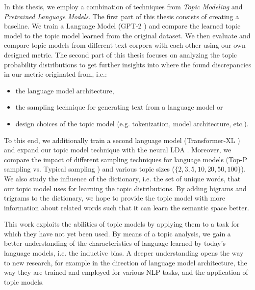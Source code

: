 In this thesis, we employ a combination of techniques from \textit{Topic Modeling} and \textit{Pretrained Language Models}. The first part of this thesis consists of creating a baseline. We train a Language Model (GPT-2 \cite{gpt-2}) and compare the learned topic model to the topic model learned from the original dataset. We then evaluate and compare topic models from different text corpora with each other using our own designed metric. The second part of this thesis focuses on analyzing the topic probability distributions to get further insights into where the found discrepancies in our metric originated from, i.e.:
\begin{itemize}
    \item the language model architecture,
    \item the sampling technique for generating text from a language model or
    \item design choices of the topic model (e.g. tokenization, model architecture, etc.).
\end{itemize}
To this end, we additionally train a second language model (Transformer-XL \cite{transformer-xl}) and expand our topic model technique with the neural LDA \cite{neuralLDA}. Moreover, we compare the impact of different sampling techniques for language models (Top-P sampling \cite{holtzman2019curious} vs. Typical sampling \cite{meister2022typical}) and various topic sizes ($\{2, 3, 5, 10, 20, 50, 100\}$). We also study the influence of the dictionary, i.e. the set of unique words, that our topic model uses for learning the topic distributions. By adding bigrams and trigrams to the dictionary, we hope to provide the topic model with more information about related words such that it can learn the semantic space better. 

This work exploits the abilities of topic models by applying them to a task for which they have not yet been used. By means of a topic analysis, we gain a better understanding of the characteristics of language learned by today's language models, i.e. the inductive bias. A deeper understanding opens the way to new research, for example in the direction of language model architecture, the way they are trained and employed for various NLP tasks, and the application of topic models.

